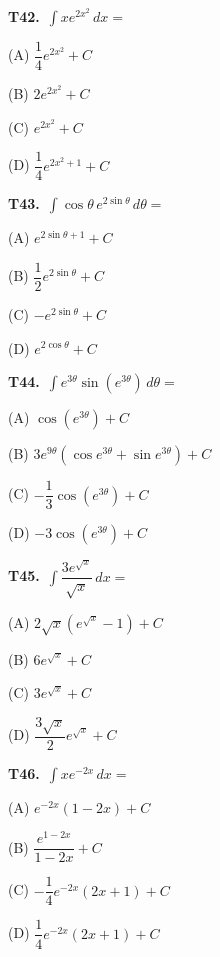 \documentclass[11pt]{article}
\begin{document}
\bigskip\noindent\textbf{T42.}\ $\displaystyle\int xe^{2x^2}\,dx =$
\begin{list}{}{\setlength{\leftmargin}{3em}\setlength{\labelwidth}{2.5em}\setlength{\itemsep}{0pt}\setlength{\topsep}{2pt}}
\item[(A)] $\dfrac{1}{4}e^{2x^2}+C$
\item[(B)] $2e^{2x^2}+C$
\item[(C)] $e^{2x^2}+C$
\item[(D)] $\dfrac{1}{4}e^{2x^2+1}+C$
\end{list}

\bigskip\noindent\textbf{T43.}\ $\displaystyle\int \cos\theta\,e^{2\sin\theta}\,d\theta =$
\begin{list}{}{\setlength{\leftmargin}{3em}\setlength{\labelwidth}{2.5em}\setlength{\itemsep}{0pt}\setlength{\topsep}{2pt}}
\item[(A)] $e^{2\sin\theta+1}+C$
\item[(B)] $\dfrac{1}{2}e^{2\sin\theta}+C$
\item[(C)] $-e^{2\sin\theta}+C$
\item[(D)] $e^{2\cos\theta}+C$
\end{list}

\bigskip\noindent\textbf{T44.}\ $\displaystyle\int e^{3\theta}\sin(e^{3\theta})\,d\theta =$
\begin{list}{}{\setlength{\leftmargin}{3em}\setlength{\labelwidth}{2.5em}\setlength{\itemsep}{0pt}\setlength{\topsep}{2pt}}
\item[(A)] $\cos(e^{3\theta})+C$
\item[(B)] $3e^{9\theta}(\cos e^{3\theta}+\sin e^{3\theta})+C$
\item[(C)] $-\dfrac{1}{3}\cos(e^{3\theta})+C$
\item[(D)] $-3\cos(e^{3\theta})+C$
\end{list}

\bigskip\noindent\textbf{T45.}\ $\displaystyle\int \dfrac{3e^{\sqrt{x}}}{\sqrt{x}}\,dx =$
\begin{list}{}{\setlength{\leftmargin}{3em}\setlength{\labelwidth}{2.5em}\setlength{\itemsep}{0pt}\setlength{\topsep}{2pt}}
\item[(A)] $2\sqrt{x}(e^{\sqrt{x}}-1)+C$
\item[(B)] $6e^{\sqrt{x}}+C$
\item[(C)] $3e^{\sqrt{x}}+C$
\item[(D)] $\dfrac{3\sqrt{x}}{2}e^{\sqrt{x}}+C$
\end{list}

\bigskip\noindent\textbf{T46.}\ $\displaystyle\int xe^{-2x}\,dx =$
\begin{list}{}{\setlength{\leftmargin}{3em}\setlength{\labelwidth}{2.5em}\setlength{\itemsep}{0pt}\setlength{\topsep}{2pt}}
\item[(A)] $e^{-2x}(1-2x)+C$
\item[(B)] $\dfrac{e^{1-2x}}{1-2x}+C$
\item[(C)] $-\dfrac{1}{4}e^{-2x}(2x+1)+C$
\item[(D)] $\dfrac{1}{4}e^{-2x}(2x+1)+C$
\end{list}
\end{document}
